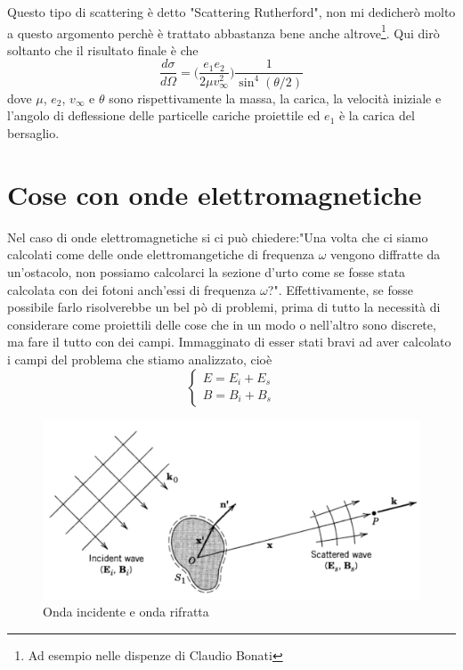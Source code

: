 \documentclass[11pt,a4paper]{article}
\begin{document}
		Questo tipo di scattering è detto "Scattering Rutherford", non mi dedicherò molto a questo argomento perchè è trattato abbastanza bene anche altrove\footnote{Ad esempio nelle dispenze di Claudio Bonati}. Qui dirò soltanto che il risultato finale è che
		\begin{equation}
			\frac{d\sigma}{d\Omega}=\Big(\frac{e_1e_2}{2\mu v_\infty^2 }\Big)\frac{1}{\sin^4(\theta/2)}
		\end{equation}
		dove $\mu$, $e_2$, $v_\infty$ e $\theta$ sono rispettivamente la massa, la carica, la velocità iniziale e l'angolo di deflessione delle particelle cariche proiettile ed $e_1$ è la carica del bersaglio.

	\section{Cose con onde elettromagnetiche}
		Nel caso di onde elettromagnetiche si ci può chiedere:"Una volta che ci siamo calcolati come delle onde elettromangetiche di frequenza $\omega$ vengono diffratte da un'ostacolo, non possiamo calcolarci la sezione d'urto come se fosse stata calcolata con dei fotoni anch'essi di frequenza $\omega$?".\newline
		Effettivamente, se fosse possibile farlo risolverebbe un bel pò di problemi, prima di tutto la necessità di considerare come proiettili delle cose che in un modo o nell'altro sono discrete, ma fare il tutto con dei campi.\newline
		Immagginato di esser stati bravi ad aver calcolato i campi del problema che stiamo analizzato, cioè
		\[
			\begin{cases}
				E=E_{i}+E_{s}\\
				B=B_{i}+B_{s}

			\end{cases}
		\]
		\begin{figure}
			\centering
    		\includegraphics[width=\linewidth]{Immagini/irraggiamento.png}
    		\caption{Onda incidente e onda rifratta}
    		\label{fig:irr}
		\end{figure}
\end{document}
